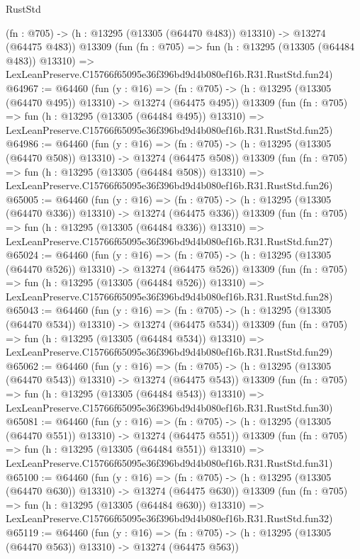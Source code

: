 \begin{lexlean}{RustStd}
\begin{coremodule}
    (fn : @705) -> (h : @13295 (@13305 (@64470 @483)) @13310) -> @13274 (@64475 @483))
    @13309
    (fun (fn : @705) =>
    fun (h : @13295 (@13305 (@64484 @483)) @13310) =>
    LexLeanPreserve.C15766f65095e36f396bd9d4b080ef16b.R31.RustStd.fun24)
@64967 := @64460
    (fun (y : @16) =>
    (fn : @705) -> (h : @13295 (@13305 (@64470 @495)) @13310) -> @13274 (@64475 @495))
    @13309
    (fun (fn : @705) =>
    fun (h : @13295 (@13305 (@64484 @495)) @13310) =>
    LexLeanPreserve.C15766f65095e36f396bd9d4b080ef16b.R31.RustStd.fun25)
@64986 := @64460
    (fun (y : @16) =>
    (fn : @705) -> (h : @13295 (@13305 (@64470 @508)) @13310) -> @13274 (@64475 @508))
    @13309
    (fun (fn : @705) =>
    fun (h : @13295 (@13305 (@64484 @508)) @13310) =>
    LexLeanPreserve.C15766f65095e36f396bd9d4b080ef16b.R31.RustStd.fun26)
@65005 := @64460
    (fun (y : @16) =>
    (fn : @705) -> (h : @13295 (@13305 (@64470 @336)) @13310) -> @13274 (@64475 @336))
    @13309
    (fun (fn : @705) =>
    fun (h : @13295 (@13305 (@64484 @336)) @13310) =>
    LexLeanPreserve.C15766f65095e36f396bd9d4b080ef16b.R31.RustStd.fun27)
@65024 := @64460
    (fun (y : @16) =>
    (fn : @705) -> (h : @13295 (@13305 (@64470 @526)) @13310) -> @13274 (@64475 @526))
    @13309
    (fun (fn : @705) =>
    fun (h : @13295 (@13305 (@64484 @526)) @13310) =>
    LexLeanPreserve.C15766f65095e36f396bd9d4b080ef16b.R31.RustStd.fun28)
@65043 := @64460
    (fun (y : @16) =>
    (fn : @705) -> (h : @13295 (@13305 (@64470 @534)) @13310) -> @13274 (@64475 @534))
    @13309
    (fun (fn : @705) =>
    fun (h : @13295 (@13305 (@64484 @534)) @13310) =>
    LexLeanPreserve.C15766f65095e36f396bd9d4b080ef16b.R31.RustStd.fun29)
@65062 := @64460
    (fun (y : @16) =>
    (fn : @705) -> (h : @13295 (@13305 (@64470 @543)) @13310) -> @13274 (@64475 @543))
    @13309
    (fun (fn : @705) =>
    fun (h : @13295 (@13305 (@64484 @543)) @13310) =>
    LexLeanPreserve.C15766f65095e36f396bd9d4b080ef16b.R31.RustStd.fun30)
@65081 := @64460
    (fun (y : @16) =>
    (fn : @705) -> (h : @13295 (@13305 (@64470 @551)) @13310) -> @13274 (@64475 @551))
    @13309
    (fun (fn : @705) =>
    fun (h : @13295 (@13305 (@64484 @551)) @13310) =>
    LexLeanPreserve.C15766f65095e36f396bd9d4b080ef16b.R31.RustStd.fun31)
@65100 := @64460
    (fun (y : @16) =>
    (fn : @705) -> (h : @13295 (@13305 (@64470 @630)) @13310) -> @13274 (@64475 @630))
    @13309
    (fun (fn : @705) =>
    fun (h : @13295 (@13305 (@64484 @630)) @13310) =>
    LexLeanPreserve.C15766f65095e36f396bd9d4b080ef16b.R31.RustStd.fun32)
@65119 := @64460
    (fun (y : @16) =>
    (fn : @705) -> (h : @13295 (@13305 (@64470 @563)) @13310) -> @13274 (@64475 @563))

\end{coremodule}
\end{lexlean}
